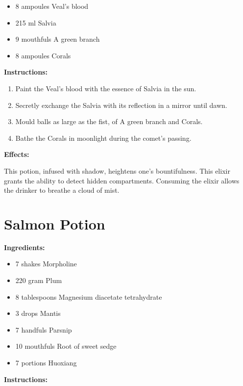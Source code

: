 \documentclass{article}
\begin{document}
\begin{itemize}
  \item 8 ampoules Veal's blood
  \item 215 ml Salvia
  \item 9 mouthfuls A green branch
  \item 8 ampoules Corals
\end{itemize}

\textbf{Instructions:}

\begin{enumerate}
  \item Paint the Veal's blood with the essence of Salvia in the sun.
  \item Secretly exchange the Salvia with its reflection in a mirror until dawn.
  \item Mould balls as large as the fist, of A green branch and Corals.
  \item Bathe the Corals in moonlight during the comet’s passing.
\end{enumerate}

\textbf{Effects:}

This potion, infused with shadow, heightens one's bountifulness. This elixir grants the ability to detect hidden compartments. Consuming the elixir allows the drinker to breathe a cloud of mist.

\newpage
\section*{Salmon Potion}

\textbf{Ingredients:}

\begin{itemize}
  \item 7 shakes Morpholine
  \item 220 gram Plum
  \item 8 tablespoons Magnesium diacetate tetrahydrate
  \item 3 drops Mantis
  \item 7 handfuls Parsnip
  \item 10 mouthfuls Root of sweet sedge
  \item 7 portions Huoxiang
\end{itemize}

\textbf{Instructions:}
\end{document}
